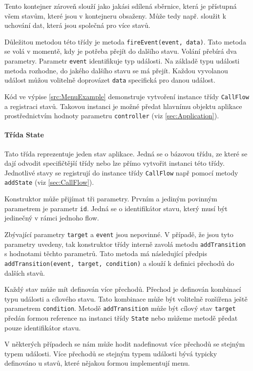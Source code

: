 \documentclass[ing,male,java,dept460,twoside]{diploma}						%
\begin{document}
Tento kontejner zároveň slouží jako jakási sdílená sběrnice, která je přístupná všem stavům, které jsou v kontejneru obsaženy. Může tedy např. sloužit k uchování dat, která jsou společná pro více stavů.

Důležitou metodou této třídy je metoda \texttt{fireEvent(event, data)}. Tato metoda se volá v momentě, kdy je potřeba přejít do dalšího stavu. Volání přebírá dva parametry. Parametr \texttt{event} identifikuje typ události. Na základě typu události metoda rozhodne, do jakého dalšího stavu se má přejít. Každou vyvolanou událost můžou volitelně doprovázet \texttt{data} specifická pro danou událost.

Kód ve výpise \ref{src:MenuExample} demonstruje vytvoření instance třídy \texttt{CallFlow} a registraci stavů. Takovou instanci je možné předat hlavnímu objektu aplikace prostřednictvím hodnoty parametru \texttt{controller} (viz \ref{sec:Application}).

\paragraph{Třída State}
\label{sec:State}
Tato třída reprezentuje jeden stav aplikace. Jedná se o bázovou třídu, ze které se dají odvodit specifičtější třídy nebo lze přímo vytvořit instanci této třídy. Jednotlivé stavy se registrují do instance třídy \texttt{CallFlow} např pomocí metody \texttt{addState} (viz \ref{sec:CallFlow}).

Konstruktor může přijímat tři parametry. Prvním a jediným povinným parametrem je parametr \texttt{id}. Jedná se o identifikátor stavu, který musí být jedinečný v rámci jednoho flow.

Zbývající parametry \texttt{target} a \texttt{event} jsou nepovinné. V případě, že jsou tyto parametry uvedeny, tak konstruktor třídy interně zavolá metodu \texttt{addTransition} s hodnotami těchto parametrů. Tato metoda má následující předpis \texttt{addTransition(event, target, condition)} a slouží k definici přechodů do dalších stavů.

Každý stav může mít definován více přechodů. Přechod je definován kombinací typu události a cílového stavu. Tato kombinace může být volitelně rozšířena ještě parametrem \texttt{condition}. Metodě \texttt{addTransition} může být cílový stav \texttt{target} předán formou reference na instanci třídy \texttt{State} nebo můžeme metodě předat pouze identifikátor stavu.

V některých případech se nám může hodit nadefinovat více přechodů se stejným typem události. Více přechodů se stejným typem události bývá typicky definováno u stavů, které nějakou formou implementují menu.
\end{document}
